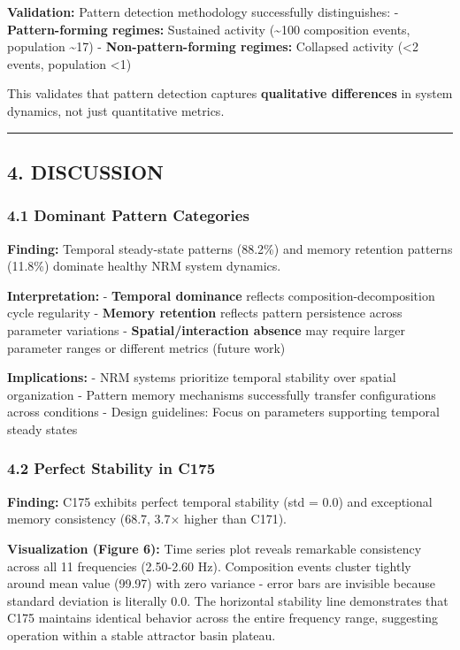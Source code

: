 \documentclass[
]{article}
\begin{document}
\textbf{Validation:} Pattern detection methodology successfully
distinguishes: - \textbf{Pattern-forming regimes:} Sustained activity
(\textasciitilde100 composition events, population \textasciitilde17) -
\textbf{Non-pattern-forming regimes:} Collapsed activity (\textless2
events, population \textless1)

This validates that pattern detection captures \textbf{qualitative
differences} in system dynamics, not just quantitative metrics.

\begin{center}\rule{0.5\linewidth}{0.5pt}\end{center}

\subsection{4. DISCUSSION}\label{discussion}

\subsubsection{4.1 Dominant Pattern
Categories}\label{dominant-pattern-categories}

\textbf{Finding:} Temporal steady-state patterns (88.2\%) and memory
retention patterns (11.8\%) dominate healthy NRM system dynamics.

\textbf{Interpretation:} - \textbf{Temporal dominance} reflects
composition-decomposition cycle regularity - \textbf{Memory retention}
reflects pattern persistence across parameter variations -
\textbf{Spatial/interaction absence} may require larger parameter ranges
or different metrics (future work)

\textbf{Implications:} - NRM systems prioritize temporal stability over
spatial organization - Pattern memory mechanisms successfully transfer
configurations across conditions - Design guidelines: Focus on
parameters supporting temporal steady states

\subsubsection{4.2 Perfect Stability in
C175}\label{perfect-stability-in-c175}

\textbf{Finding:} C175 exhibits perfect temporal stability (std = 0.0)
and exceptional memory consistency (68.7, 3.7× higher than C171).

\textbf{Visualization (Figure 6):} Time series plot reveals remarkable
consistency across all 11 frequencies (2.50-2.60 Hz). Composition events
cluster tightly around mean value (99.97) with zero variance - error
bars are invisible because standard deviation is literally 0.0. The
horizontal stability line demonstrates that C175 maintains identical
behavior across the entire frequency range, suggesting operation within
a stable attractor basin plateau.
\end{document}
